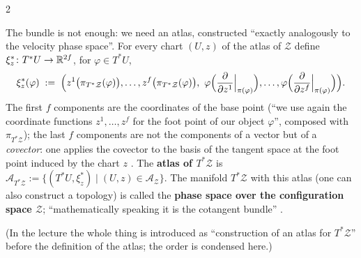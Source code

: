 \begin{paracol}{2}
\begin{definition}\label{def:hq-xistar}
The bundle is not enough: we need an atlas, constructed ``exactly analogously to the velocity phase space''. For every chart $(U,z)$ of the atlas of $\mathcal Z$ define $\xi^*_z\colon T^*U\to\mathbb{R}^{2f}$, for $\varphi\in T^*U$,
\begin{equation}\label{eq:hq-xistar}
  \xi^*_z(\varphi)\;:=\;\Bigl(z^1\bigl(\pi_{T^*\mathcal Z}(\varphi)\bigr),\dots,z^f\bigl(\pi_{T^*\mathcal Z}(\varphi)\bigr),\ \varphi\Bigl(\frac{\partial}{\partial z^1}\Big|_{\pi(\varphi)}\Bigr),\dots,\varphi\Bigl(\frac{\partial}{\partial z^f}\Big|_{\pi(\varphi)}\Bigr)\Bigr).
\end{equation}
The first $f$ components are the coordinates of the base point (``we use again the coordinate functions $z^1,\dots,z^f$ for the foot point of our object $\varphi$'', composed with $\pi_{T^*\mathcal Z}$); the last $f$ components are not the components of a vector but of a \emph{covector}: one applies the covector to the basis of the tangent space at the foot point induced by the chart $z$ . The \textbf{atlas of $T^*\mathcal Z$} is $\mathcal A_{T^*\mathcal Z}:=\{(T^*U,\xi^*_z)\mid(U,z)\in\mathcal A_{\mathcal Z}\}$. The manifold $T^*\mathcal Z$ with this atlas (one can also construct a topology) is called the \textbf{phase space over the configuration space $\mathcal Z$}; ``mathematically speaking it is the cotangent bundle'' .
\end{definition}
(In the lecture the whole thing is introduced as ``construction of an atlas for $T^*\mathcal Z$'' before the definition of the atlas; the order is condensed here.) 


\end{paracol}
